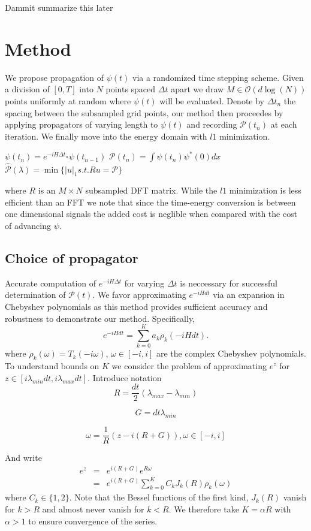 \documentclass[12pt]{amsart}
\theoremstyle{remark}
\begin{document}
Dammit summarize this later

\section{Method}

We propose propagation of $\psi(t)$ via a randomized time stepping scheme. Given a division of $[0,T]$ into $N$ points spaced $\Delta t$ apart we draw $M \in \mathcal{O}(d \log(N))$ points uniformly at random where $\psi(t)$ will be evaluated. Denote by $\Delta t_n$ the spacing between the subsampled grid points, our method then proceedes by applying propagators of varying length to $\psi(t)$ and recording $\mathcal{P}(t_n)$ at each iteration. We finally move into the energy domain with $l1$ minimization.

\begin{algorithmic}
\STATE $\psi(t_n) = e^{-iH\Delta t_n}\psi(t_{n-1})$
\STATE $\mathcal{P}(t_n) = \int \psi(t_n)\psi^*(0) dx$
\ENDFOR
\STATE $\hat{\mathcal{P}}(\lambda) = \min \{ |u|_1 s.t. Ru = \mathcal{P} \}$
\end{algorithmic}
where $R$ is an $M \times N$ subsampled DFT matrix. While the $l1$ minimization is less efficient than an FFT we note that since the time-energy conversion is between one dimensional signals the added cost is neglible when compared with the cost of advancing $\psi$.

\subsection{Choice of propagator}
Accurate computation of $e^{-iH\Delta t}$ for varying $\Delta t$ is neccessary for successful determination of $\mathcal{P}(t)$. We favor approximating $e^{-iHdt}$ via an expansion in Chebyshev polynomials \cite{Aviv1984} as this method provides sufficient accuracy and robustness to demonstrate our method. Specifically,
$$
e^{-iHdt} = \sum_{k=0}^K a_k \rho_k (-iHdt).
$$
where $\rho_k(\omega) = T_k(-i\omega)$, $\omega \in [-i,i]$ are the complex Chebyshev polynomials. To understand bounds on $K$ we consider the problem of approximating $e^z$ for $z \in [i \lambda_{min} dt, i \lambda_{max} dt]$. Introduce notation
$$
R = \frac{dt}{2}(\lambda_{max} - \lambda_{min})
$$

$$
G = dt \lambda_{min}
$$

$$
\omega = \frac{1}{R}(z - i(R+G)),\omega \in [-i,i]
$$

And write
\begin{eqnarray}
e^{z} & = & e^{i(R+G)}e^{R\omega} \\
& = & e^{i(R+G)}\sum_{k=0}^K C_k J_k(R) \rho_k(\omega)
\end{eqnarray}
where $C_k \in \{1,2 \} $. Note that the Bessel functions of the first kind, $J_k(R)$ vanish for $k>R$ and almost never vanish for $k<R$. We therefore take $K= \alpha R$ with $\alpha >1$ to ensure convergence of the series.







\end{document}
